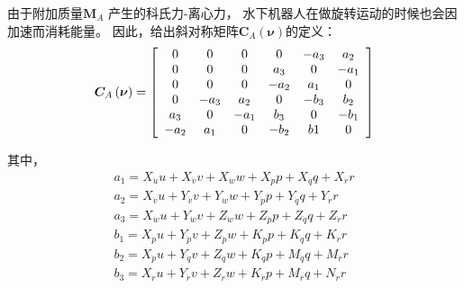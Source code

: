 由于附加质量$\bm{M}_A$ 产生的科氏力-离心力， 水下机器人在做旋转运动的时候也会因加速而消耗能量。 因此，给出斜对称矩阵${\bm{C}_A}\left( \bm{ \nu}  \right)$的定义：
\begin{equation}
\centering
\label{eq:chap2:20}
{\bm{C}_A}\left( \bm{ \nu}  \right) = \left[ {\begin{array}{*{20}{c}}
   0 & 0 & 0 & 0 & { - {a_3}} & {{a_2}}  \\
   0 & 0 & 0 & {{a_3}} & 0 & { - {a_1}}  \\
   0 & 0 & 0 & { - {a_2}} & {{a_1}} & 0  \\
   0 & { - {a_3}} & {{a_2}} & 0 & { - {b_3}} & {{b_2}}  \\
   {{a_3}} & 0 & { - {a_1}} & {{b_3}} & 0 & { - {b_1}}  \\
   { - {a_2}} & {{a_1}} & 0 & { - {b_2}} & {b1} & 0  \\
\end{array}} \right]
\end{equation}

其中，\begin{equation*}
\label{eq:chap2:21}
\begin{array}{l}
 {a_1} = {X_{\dot u}}u + {X_{\dot v}}v + {X_{\dot w}}w + {X_{\dot p}}p + {X_{\dot q}}q + {X_{\dot r}}r \\
 {a_2} = {X_{\dot v}}u + {Y_{\dot v}}v + {Y_{\dot w}}w + {Y_{\dot p}}p + {Y_{\dot q}}q + {Y_{\dot r}}r \\
 {a_3} = {X_{\dot w}}u + {Y_{\dot w}}v + {Z_{\dot w}}w + {Z_{\dot p}}p + {Z_{\dot q}}q + {Z_{\dot r}}r \\
 {b_1} = {X_{\dot p}}u + {Y_{\dot p}}v + {Z_{\dot p}}w + {K_{\dot p}}p + {K_{\dot q}}q + {K_{\dot r}}r \\
 {b_2} = {X_{\dot p}}u + {Y_{\dot q}}v + {Z_{\dot q}}w + {K_{\dot q}}p + {M_{\dot q}}q + {M_{\dot r}}r \\
 {b_3} = {X_{\dot r}}u + {Y_{\dot r}}v + {Z_{\dot r}}w + {K_{\dot r}}p + {M_{\dot r}}q + {N_{\dot r}}r \\
 \end{array}
 \end{equation*}

